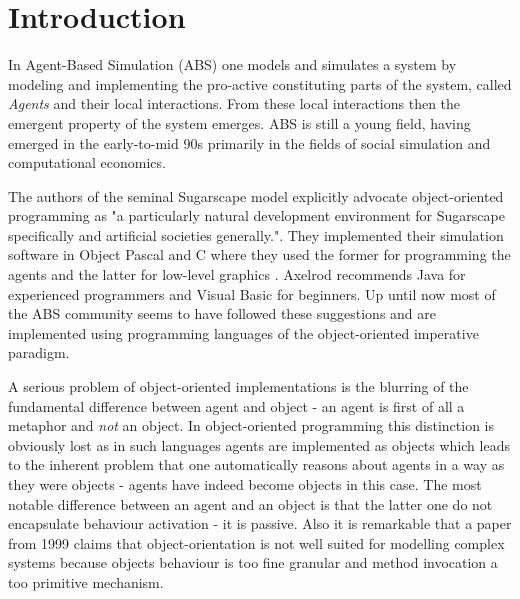 \section{Introduction}

In Agent-Based Simulation (ABS) one models and simulates a system by modeling and implementing the pro-active constituting parts of the system, called \textit{Agents} and their local interactions. From these local interactions then the emergent property of the system emerges. ABS is still a young field, having emerged in the early-to-mid 90s primarily in the fields of social simulation and computational economics. 

The authors of the seminal Sugarscape model \cite{epstein_growing_1996} explicitly advocate object-oriented programming as "a particularly natural development environment for Sugarscape specifically and artificial societies generally.". They implemented their simulation software in Object Pascal and C where they used the former for programming the agents and the latter for low-level graphics \cite{axtell_aligning_1996}. Axelrod \cite{axelrod_advancing_1997} recommends Java for experienced programmers and Visual Basic for beginners. Up until now most of the ABS community seems to have followed these suggestions and are implemented using programming languages of the object-oriented imperative paradigm.

A serious problem of object-oriented implementations is the blurring of the fundamental difference between agent and object - an agent is first of all a metaphor and \textit{not} an object. In object-oriented programming this distinction is obviously lost as in such languages agents are implemented as objects which leads to the inherent problem that one automatically reasons about agents in a way as they were objects - agents have indeed become objects in this case. The most notable difference between an agent and an object is that the latter one do not encapsulate behaviour activation \cite{jennings_agent-based_2000} - it is passive. Also it is remarkable that \cite{jennings_agent-based_2000} a paper from 1999 claims that object-orientation is not well suited for modelling complex systems because objects behaviour is too fine granular and method invocation a too primitive mechanism.

